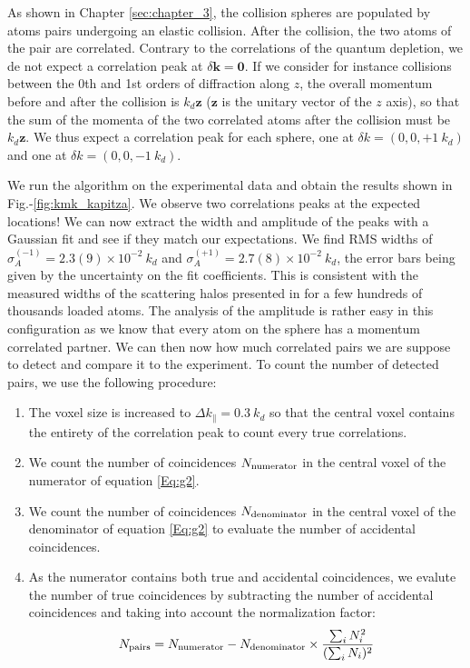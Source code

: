As shown in Chapter \ref{sec:chapter_3}, the collision spheres are populated by atoms pairs undergoing an elastic collision. After the collision, the two atoms of the pair are \kmk correlated. Contrary to the \kmk correlations of the quantum depletion, we de not expect a correlation peak at $\delta \bm{k}=\bm{0}$. If we consider for instance collisions between the 0th and 1st orders of diffraction along $z$, the overall momentum before and after the collision is $k_d \bm{z}$ ($\bm{z}$ is the unitary vector of the $z$ axis), so that the sum of the momenta of the two correlated atoms after the collision must be $k_d \bm{z}$. We thus expect a correlation peak for each sphere, one at $\delta k = (0,0,+1 \ k_d)$  and one at $\delta k = (0,0,-1 \ k_d)$.

We run the algorithm on the experimental data and obtain the results shown in Fig.-\ref{fig:kmk_kapitza}. We observe two correlations peaks at the expected locations! We can now extract the width and amplitude of the peaks with a Gaussian fit and see if they match our expectations. We find RMS widths of $\sigma_A^{(-1)}=2.3(9) \times 10^{-2} \ k_d$ and $\sigma_A^{(+1)}=2.7(8) \times 10^{-2} \ k_d$, the error bars being given by the uncertainty on the fit coefficients. This is consistent with the measured widths of the scattering halos presented in  for a few hundreds of thousands loaded atoms. 
The analysis of the amplitude is rather easy in this configuration as we know that every atom on the sphere has a momentum correlated partner. We can then now how much correlated pairs we are suppose to detect and compare it to the experiment. To count the number of detected pairs, we use the following procedure:


\begin{enumerate}
    \item The voxel size is increased to $\Delta k_{\parallel} = 0.3 \ k_d$ so that the central voxel contains the entirety of the correlation peak to count every true correlations.
    
    \item We count the number of coincidences $N_{\rm{numerator}}$ in the central voxel of the numerator of equation \ref{Eq:g2}. 
 
   
    \item  We count the number of coincidences $N_{\rm{denominator}}$ in the central voxel of the denominator of equation \ref{Eq:g2} to evaluate the number of accidental coincidences. 
    
    
    \item As the numerator contains both true and accidental coincidences, we evalute the number of true coincidences by subtracting the number of accidental coincidences and taking into account the normalization factor:
    \begin{equation}
          N_{\rm{pairs}}=N_{\rm{numerator}} - N_{\rm{denominator}} \times \frac{\sum_i N_i^2}{(\sum_i N_i)^2}
    \end{equation}
  
\end{enumerate}

